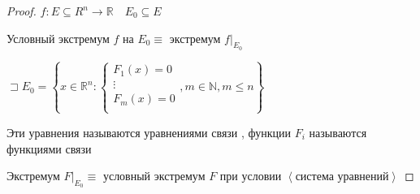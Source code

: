 \documentclass{book}
\newcommand\N{\ensuremath{\mathbb{N}}}
\newcommand\R{\ensuremath{\mathbb{R}}}
\theoremstyle{definition}
\begin{document}
\begin{proof}
    $f:E\subseteq R^n \to \R\quad E_0\subseteq E$

    Условный экстремум $f$ на  $E_0\equiv$ экстремум $f |_{E_0}$

    $\sqsupset E_0 = \left\{ x\in \R^n: \begin{cases}
            F_1(x) = 0\\
            \vdots\\
            F_m(x) = 0\\
    \end{cases}, m\in \N , m\leqslant n \right\} $ 

    Эти уравнения называются уравнениями связи , функции $F_i$ называются функциями связи

    Экстремум  $F|_{E_0}\equiv $ условный экстремум $F$ при условии  $\left<\text{система уравнений} \right>$
\end{proof}
\end{document}
